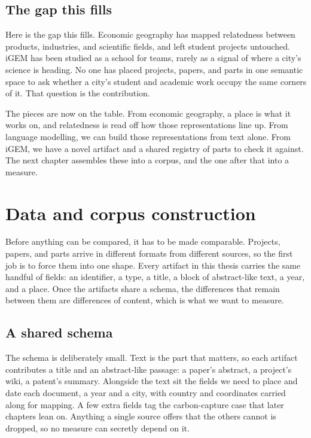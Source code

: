 \documentclass[12pt,a4paper]{article}
\begin{document}
	\subsection{The gap this fills}
	
	Here is the gap this fills. Economic geography has mapped relatedness between
	products, industries, and scientific fields, and left student projects untouched.
	iGEM has been studied as a school for teams, rarely as a signal of where a city's
	science is heading. No one has placed projects, papers, and parts in one semantic
	space to ask whether a city's student and academic work occupy the same corners of
	it. That question is the contribution.
	
	The pieces are now on the table. From economic geography, a place is what it works
	on, and relatedness is read off how those representations line up. From language
	modelling, we can build those representations from text alone. From iGEM, we have
	a novel artifact and a shared registry of parts to check it against. The next
	chapter assembles these into a corpus, and the one after that into a measure.
	
	\section{Data and corpus construction}
	
	Before anything can be compared, it has to be made comparable. Projects, papers,
	and parts arrive in different formats from different sources, so the first job is
	to force them into one shape. Every artifact in this thesis carries the same
	handful of fields: an identifier, a type, a title, a block of abstract-like text,
	a year, and a place. Once the artifacts share a schema, the differences that
	remain between them are differences of content, which is what we want to measure.
	
	\subsection{A shared schema}
	
	The schema is deliberately small. Text is the part that matters, so each artifact
	contributes a title and an abstract-like passage: a paper's abstract, a project's
	wiki, a patent's summary. Alongside the text sit the fields we need to place and
	date each document, a year and a city, with country and coordinates carried along
	for mapping. A few extra fields tag the carbon-capture case that later chapters
	lean on. Anything a single source offers that the others cannot is dropped, so no
	measure can secretly depend on it.
	
\end{document}
